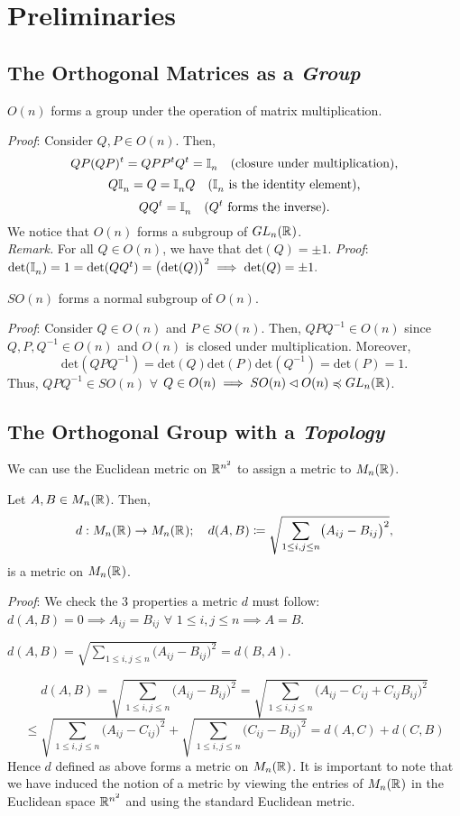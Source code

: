 \section{Preliminaries}
\label{s:prelims}
\subsection{The Orthogonal Matrices as a \emph{Group}}
\begin{theorem}
$O(n)$ forms a group under the operation of matrix multiplication.
\end{theorem}
\emph{Proof}: Consider $Q, P \in O(n)$. Then,
\[
QP(QP)^{t} = QPP^{t}Q^{t} = \I_n \quad \text{(closure under multiplication),}
\]
\[
Q\I_n = Q = \I_n Q \quad \text{($\I_n$ is the identity element),}
\]
\[
QQ^{t} = \I_n \quad \text{($Q^{t}$ forms the inverse).}
\]
We notice that $O(n)$ forms a subgroup of $GL_n(\R)$. \\
\emph{Remark.} For all $Q \in O(n)$, we have that $\mathrm{det}(Q) = \pm 1.$ \emph{Proof}: $\mathrm{det}(\I_n) = 1 = \mathrm{det}(QQ^{t}) = \bigl(\mathrm{det}(Q)\bigr)^{2} \implies \mathrm{det}(Q) = \pm 1.$

\begin{theorem}
$SO(n)$ forms a normal subgroup of $O(n)$.
\end{theorem}
\emph{Proof}: Consider $Q \in O(n)$ and $P \in SO(n)$. Then, $QPQ^{-1} \in O(n)$ since $Q, P, Q^{-1} \in O(n)$ and $O(n)$ is closed under multiplication. Moreover,
\[
\mathrm{det}(QPQ^{-1}) = \mathrm{det}(Q)\mathrm{det}(P)\mathrm{det}(Q^{-1}) = \mathrm{det}(P) = 1.
\] 
Thus, $QPQ^{-1} \in SO(n)$ $\forall$ $Q \in O(n) \implies SO(n) \lhd O(n) \preccurlyeq GL_n(\R)$.

\subsection{The Orthogonal Group with a \emph{Topology}}
We can use the Euclidean metric on $\R[n^2]$ to assign a metric to  $M_n(\R)$.
\begin{theorem}
Let $A, B \in M_n(\R)$. Then,
\[
d: M_n(\R) \mapsto M_n(\R); \quad d(A, B) \Let \sqrt{\sum_{1\leq i, j \leq n}\bigl(A_{ij} - B_{ij}\bigr)^{2}},
\]
is a metric on $M_n(\R)$.
\end{theorem}
\emph{Proof}: We check the 3 properties a metric $d$ must follow: \\
$d(A, B) = 0 \implies A_{ij} = B_{ij}$ $\forall$ $1 \leq i, j \leq n \implies A = B$.

$d(A, B) = \sqrt{\sum_{1\leq i, j \leq n}\bigl(A_{ij} - B_{ij}\bigr)^{2}} = d(B, A)$.

\[
d(A, B) = \sqrt{\sum_{1\leq i, j \leq n}\bigl(A_{ij} - B_{ij}\bigr)^{2}} = \sqrt{\sum_{1\leq i, j \leq n}\bigl(A_{ij} - C_{ij} + C_{ij} B_{ij}\bigr)^{2}}  
\]
\[
\leq \sqrt{\sum_{1\leq i, j \leq n}\bigl(A_{ij} - C_{ij}\bigr)^{2}} + \sqrt{\sum_{1\leq i, j \leq n}\bigl(C_{ij} - B_{ij}\bigr)^{2}} = d(A,C) + d(C,B) 
\]
Hence $d$ defined as above forms a metric on $M_n(\R)$. It is important to note that we have induced the notion of a metric by viewing the entries of $M_n(\R)$ in the Euclidean space $\R[n^2]$ and using the standard Euclidean metric.
